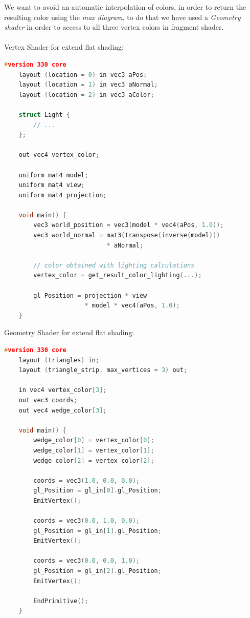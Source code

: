 We want to avoid an automatic interpolation of colors, in order to return the resulting color using the \textit{max diagram}, to do that we have used a \textit{Geometry shader} in order to access to all three vertex colors in fragment shader.
\\
\\
Vertex Shader for extend flat shading:
\begin{lstlisting}[language=C++,
    directivestyle={\color{black}}
    emph={int,char,double,float,unsigned},
    emphstyle={\color{blue}}
   ]
    #version 330 core
    layout (location = 0) in vec3 aPos;
    layout (location = 1) in vec3 aNormal;
    layout (location = 2) in vec3 aColor;

    struct Light {
        // ...
    };

    out vec4 vertex_color;

    uniform mat4 model;
    uniform mat4 view;
    uniform mat4 projection;

    void main() {
        vec3 world_position = vec3(model * vec4(aPos, 1.0));
        vec3 world_normal = mat3(transpose(inverse(model)))
                            * aNormal;

        // color obtained with lighting calculations
        vertex_color = get_result_color_lighting(...);

        gl_Position = projection * view
                      * model * vec4(aPos, 1.0);
    }
\end{lstlisting}

Geometry Shader for extend flat shading:
\begin{lstlisting}[language=C++,
    directivestyle={\color{black}}
    emph={int,char,double,float,unsigned},
    emphstyle={\color{blue}}
   ]
    #version 330 core
    layout (triangles) in;
    layout (triangle_strip, max_vertices = 3) out;

    in vec4 vertex_color[3];
    out vec3 coords;
    out vec4 wedge_color[3];

    void main() {
        wedge_color[0] = vertex_color[0];
        wedge_color[1] = vertex_color[1];
        wedge_color[2] = vertex_color[2];

        coords = vec3(1.0, 0.0, 0.0);
        gl_Position = gl_in[0].gl_Position;
        EmitVertex();

        coords = vec3(0.0, 1.0, 0.0);
        gl_Position = gl_in[1].gl_Position;
        EmitVertex();

        coords = vec3(0.0, 0.0, 1.0);
        gl_Position = gl_in[2].gl_Position;
        EmitVertex();

        EndPrimitive();
    }
\end{lstlisting}

